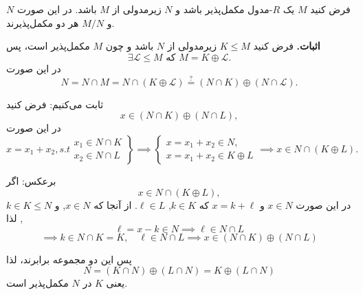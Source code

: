\section{}


\begin{frame}
    \begin{theorem}
        فرض کنید \( M \) یک \( R \)-مدول مکمل‌پذیر باشد و \( N \) زیرمدولی از \( M \) باشد. در این صورت \( N \) و \( M/N \) هر دو مکمل‌پذیرند.

    \end{theorem}


    \textbf{اثبات.} فرض کنید \( K \leq M \) زیرمدولی از \( N \) باشد و چون \( M \) مکمل‌پذیر است، پس
    \[
        \exists \mathcal{L} \leq M \text{ که } M = K \oplus \mathcal{L} .
    \]
    در این صورت
    \[
        N = N \cap M = N \cap (K \oplus \mathcal{L} ) \mathrel{\overset{{{?}}}{=}} (N \cap K) \oplus (N \cap \mathcal{L} ).
    \]


\end{frame}



\begin{frame}
    ثابت  می‌کنیم:
    فرض کنید
    \[
        x \in (N \cap K) \oplus (N \cap L),
    \]
    در این صورت
    \[
        x = x_1 + x_2, s.t
        \left.
        \begin{aligned}
            x_1 \in N \cap K \\
            x_2 \in N \cap L
        \end{aligned}
        \right\}
        \implies
        \begin{cases}
            x = x_1 + x_2 \in N, \\
            x = x_1 + x_2 \in K \oplus L
        \end{cases}
        \implies x \in N \cap (K \oplus L).
    \]

\end{frame}

\begin{frame}
    برعکس: اگر
    \[
        x \in N \cap (K \oplus L),
    \]
    در این صورت \( x \in N \) و \( x = k + \ell \) که \( k \in K \), \( \ell \in L \).
    از آنجا که \( x \in N \), و \( k \in K \leqslant N\), لذا
    \[
        \ell = x - k \in N \implies \ell \in N \cap L
    \]
    \[
        \implies k \in N \cap K = K, \quad \ell \in N \cap L \implies x \in (N \cap K) \oplus (N \cap L)
    \]

    پس این دو مجموعه برابرند، لذا
    \[
        N = (K \cap N) \oplus (L \cap N) =  K \oplus (L \cap N)
    \]
    یعنی
    \( K \)
    در
    \( N \)
    مکمل‌پذیر است.



\end{frame}


